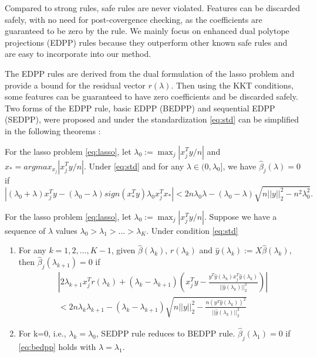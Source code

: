 Compared to strong rules, safe rules are never violated. Features can be discarded safely, with no need for post-covergence checking, as the coefficients are guaranteed to be zero by the rule. We mainly focus on enhanced dual polytope projections (EDPP) rules\citep{wang2013lasso} because they outperform other known safe rules and are easy to incorporate into our method.

The EDPP rules are derived from the dual formulation of the lasso problem and provide a bound for the residual vector $r(\lambda)$. Then using the KKT conditions, some features can be guaranteed to have zero coefficients and be discarded safely. Two forms of the EDPP rule, basic EDPP (BEDPP) and sequential EDPP (SEDPP)\citep{wang2013lasso}, were proposed and under the standardization \eqref{eq:std} can be simplified in the following theorems \citep{Zeng2021}:

\begin{theorem}[BEDPP]
    For the lasso problem \eqref{eq:lasso}, let $\lambda_0:=\max_j|x_j^Ty/n|$ and $x_*=argmax_{x_j}|x_j^Ty/n|$. Under \eqref{eq:std} and for any $\lambda\in(0,\lambda_0]$, we have $\hat{\beta}_j(\lambda)=0$ if
    \begin{equation}
        \label{eq:bedpp}
        |(\lambda_0+\lambda)x_j^Ty-(\lambda_0-\lambda)sign(x_*^Ty)\lambda_0x_j^Tx_*|<2n\lambda_0\lambda-(\lambda_0-\lambda)\sqrt{n||y||_2^2-n^2\lambda_0^2}.
    \end{equation}
\end{theorem}

\begin{theorem}[SEDPP]
    For the lasso problem \eqref{eq:lasso}, let $\lambda_0:=\max_j|x_j^Ty/n|$. Suppose we have a sequence of $\lambda$ values $\lambda_0>\lambda_1>...>\lambda_K$. Under condition \eqref{eq:std}
    \begin{enumerate}
        \item For any $k=1,2,...,K-1$, given $\hat{\beta}(\lambda_k)$, $r(\lambda_k)$ and $\hat{y}(\lambda_k):=X\hat{\beta}(\lambda_k)$, then $\hat{\beta}_j(\lambda_{k+1})=0$ if
        \begin{equation}
            \label{eq:sedpp}
            \begin{split}
                &\left|2\lambda_{k+1}x_j^Tr(\lambda_k)+(\lambda_k-\lambda_{k+1})\left( x_j^Ty-\frac{y^T\hat{y}(\lambda_k)x_j^T\hat{y}(\lambda_k)}{||\hat{y}(\lambda_k)||_2^2}\right)\right|\\&<2n\lambda_k\lambda_{k+1}-(\lambda_k-\lambda_{k+1})\sqrt{n||y||_2^2-\frac{n(y^T\hat{y}(\lambda_k))^2}{||\hat{y}(\lambda_k)||_2^2}}
            \end{split}
        \end{equation}
        \item For k=0, i.e., $\lambda_k=\lambda_0$, SEDPP rule reduces to BEDPP rule. $\hat{\beta}_j(\lambda_1)=0$ if \eqref{eq:bedpp} holds with $\lambda=\lambda_1$.
    \end{enumerate}
\end{theorem}

